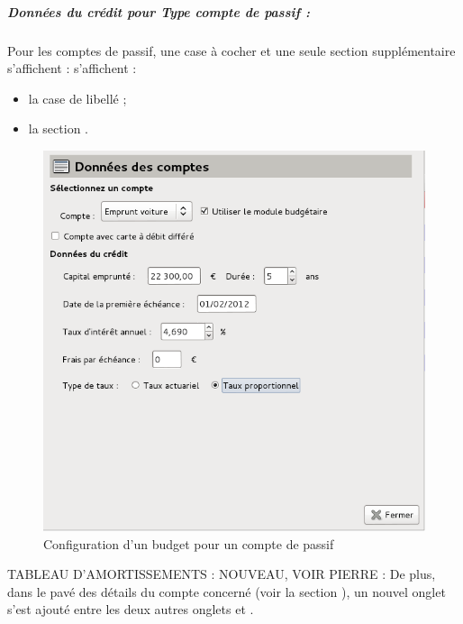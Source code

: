 \subparagraph{Données du crédit pour Type compte de passif :\label{setup-budget-data-liability}}

Pour les comptes de passif, une case à cocher et une seule section supplémentaire \ifIllustration s'affichent :
\else s'affichent :
\fi

\begin{itemize}
	\item la case de libellé  ; 
	\item la section .
\end{itemize}

\ifIllustration
\begin{figure}[ht]
\begin{center}
\includegraphics[scale=0.5]{image/screenshot/setup_budget_dataLiability}
\end{center}
\caption{Configuration d'un budget pour un compte de passif}
\label{setup_budget_dataLiability-img}
\end{figure}
\fi

TABLEAU D'AMORTISSEMENTS : NOUVEAU, VOIR PIERRE :
De plus, dans le pavé des détails du compte concerné (voir la section     ), un nouvel onglet  s'est ajouté entre les deux autres onglets  et .

